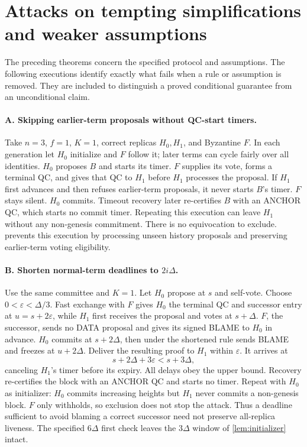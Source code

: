 \documentclass[11pt,a4paper]{article}
\newcounter{protocol}
\begin{document}
\section{Attacks on tempting simplifications and weaker assumptions}
\label{sec:attacks}
The preceding theorems concern the specified protocol and assumptions.
The following executions identify exactly what fails when a rule or
assumption is removed. They are included to distinguish a proved conditional
guarantee from an unconditional claim.

\paragraph{A. Skipping earlier-term proposals without QC-start
timers.}
Take $n=3$, $f=1$, $K=1$, correct replicas $H_0,H_1$, and Byzantine $F$.
In each generation let $H_0$ initialize and $F$ follow it; later terms
can cycle fairly over all identities. $H_0$ proposes $B$ and starts its
timer. $F$ supplies its vote, forms a terminal QC, and gives that QC to
$H_1$ before $H_1$ processes the proposal. If $H_1$ first advances and
then refuses earlier-term proposals, it never starts $B$'s timer.
$F$ stays silent. $H_0$ commits. Timeout recovery later
re-certifies $B$ with an ANCHOR QC, which starts no commit
timer.
Repeating this execution can leave $H_1$ without any non-genesis
commitment. There is no equivocation to exclude.
 prevents this execution by processing unseen history
proposals and preserving earlier-term voting eligibility.

\paragraph{B. Shorten normal-term deadlines to $2i\Delta$.}
Use the same committee and $K=1$. Let $H_0$ propose at $s$ and self-vote.
Choose $0<\varepsilon<\Delta/3$. Fast exchange with $F$ gives $H_0$ the
terminal QC and successor entry at $u=s+2\varepsilon$, while $H_1$
first receives the proposal and votes at $s+\Delta$. $F$, the successor,
sends no DATA proposal and gives its signed BLAME to $H_0$ in
advance. $H_0$ commits at $s+2\Delta$, then under the shortened rule sends
BLAME and freezes at $u+2\Delta$. Deliver the resulting proof to $H_1$
within $\varepsilon$. It arrives at
\[
 s+2\Delta+3\varepsilon<s+3\Delta,
\]
canceling $H_1$'s timer before its expiry. All delays obey the upper bound.
Recovery re-certifies the block with an ANCHOR QC and starts no
timer. Repeat with $H_0$ as initializer:
$H_0$ commits increasing heights but $H_1$ never commits a non-genesis
block. $F$ only withholds, so exclusion does not stop the attack.
Thus a deadline sufficient to avoid blaming a correct successor need not
preserve all-replica liveness. The specified $6\Delta$ first check leaves
the $3\Delta$ window of \cref{lem:initializer} intact.
\end{document}
